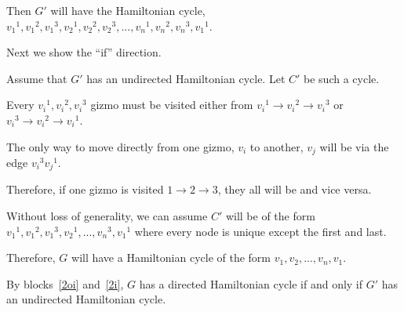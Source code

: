 \documentclass[11pt]{article}
\begin{document}
\begin{problems}
\begin{longFormProof}
\begin{block}[2oi]
      \step Then $G'$ will have the Hamiltonian cycle, ${v_1}^1, {v_1}^2, {v_1}^3, {v_2}^1, {v_2}^2, {v_2}^3, ..., {v_n}^1, {v_n}^2, {v_n}^3, {v_1}^1$.

    \end{block} 
    \step Next we show the ``if'' direction.
    \begin{block}[2i]
      {Assume that $G'$ has an undirected Hamiltonian cycle.}
      \step Let $C'$ be such a cycle.

      \step Every ${v_i}^1, {v_i}^2, {v_i}^3$ gizmo must be visited either from 
            ${v_i}^1\rightarrow{v_i}^2\rightarrow{v_i}^3$ or ${v_i}^3\rightarrow{v_i}^2\rightarrow{v_i}^1$.

      \step The only way to move directly from one gizmo, $v_i$ to another, $v_j$ will be via the edge ${v_i}^3{v_j}^1$.

      \step Therefore, if one gizmo is visited $1\rightarrow2\rightarrow3$, they all will be and vice versa.

      \step Without loss of generality, we can assume $C'$ will be of the form ${v_1}^1, {v_1}^2, {v_1}^3, {v_2}^1, ..., {v_n}^3, {v_1}^1$ where every node is unique except the first and last.

      \step Therefore, $G$ will have a Hamiltonian cycle of the form $v_1, v_2, ..., v_n, v_1$.

    \end{block} 
    \step By blocks~\ref{2oi} and~\ref{2i},
    $G$ has a directed Hamiltonian cycle
    if and only if $G'$ has an undirected Hamiltonian cycle.
  \end{longFormProof}



  

  


\end{problems}
\end{document}
